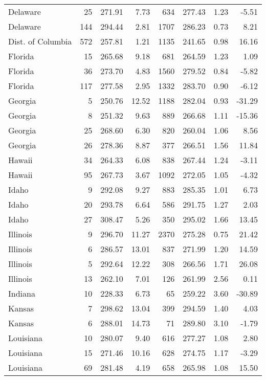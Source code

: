 \begin{longtable}{lrrr@{\extracolsep{10pt}}rrrr}
  Delaware &  25 & 271.91 & 7.73 & 634 & 277.43 & 1.23 & -5.51 \\ 
  Delaware & 144 & 294.44 & 2.81 & 1707 & 286.23 & 0.73 & 8.21 \\ 
  Dist. of Columbia & 572 & 257.81 & 1.21 & 1135 & 241.65 & 0.98 & 16.16 \\ 
  Florida &  15 & 265.68 & 9.18 & 681 & 264.59 & 1.23 & 1.09 \\ 
  Florida &  36 & 273.70 & 4.83 & 1560 & 279.52 & 0.84 & -5.82 \\ 
  Florida & 117 & 277.58 & 2.95 & 1332 & 283.70 & 0.90 & -6.12 \\ 
  Georgia &   5 & 250.76 & 12.52 & 1188 & 282.04 & 0.93 & -31.29 \\ 
  Georgia &   8 & 251.32 & 9.63 & 889 & 266.68 & 1.11 & -15.36 \\ 
  Georgia &  25 & 268.60 & 6.30 & 820 & 260.04 & 1.06 & 8.56 \\ 
  Georgia &  26 & 278.36 & 8.87 & 377 & 266.51 & 1.56 & 11.84 \\ 
  Hawaii &  34 & 264.33 & 6.08 & 838 & 267.44 & 1.24 & -3.11 \\ 
  Hawaii &  95 & 267.73 & 3.67 & 1092 & 272.05 & 1.05 & -4.32 \\ 
  Idaho &   9 & 292.08 & 9.27 & 883 & 285.35 & 1.01 & 6.73 \\ 
  Idaho &  20 & 293.78 & 6.64 & 586 & 291.75 & 1.27 & 2.03 \\ 
  Idaho &  27 & 308.47 & 5.26 & 350 & 295.02 & 1.66 & 13.45 \\ 
  Illinois &   9 & 296.70 & 11.27 & 2370 & 275.28 & 0.75 & 21.42 \\ 
  Illinois &   6 & 286.57 & 13.01 & 837 & 271.99 & 1.20 & 14.59 \\ 
  Illinois &   5 & 292.64 & 12.22 & 308 & 266.56 & 1.71 & 26.08 \\ 
  Illinois &  13 & 262.10 & 7.01 & 126 & 261.99 & 2.56 & 0.11 \\ 
  Indiana &  10 & 228.33 & 6.73 &  65 & 259.22 & 3.60 & -30.89 \\ 
  Kansas &   7 & 298.62 & 13.04 & 399 & 294.59 & 1.40 & 4.03 \\ 
  Kansas &   6 & 288.01 & 14.73 &  71 & 289.80 & 3.10 & -1.79 \\ 
  Louisiana &  10 & 280.07 & 9.40 & 616 & 277.27 & 1.08 & 2.80 \\ 
  Louisiana &  15 & 271.46 & 10.16 & 628 & 274.75 & 1.17 & -3.29 \\ 
  Louisiana &  69 & 281.48 & 4.19 & 658 & 265.98 & 1.08 & 15.50 \\ 

\end{longtable}
